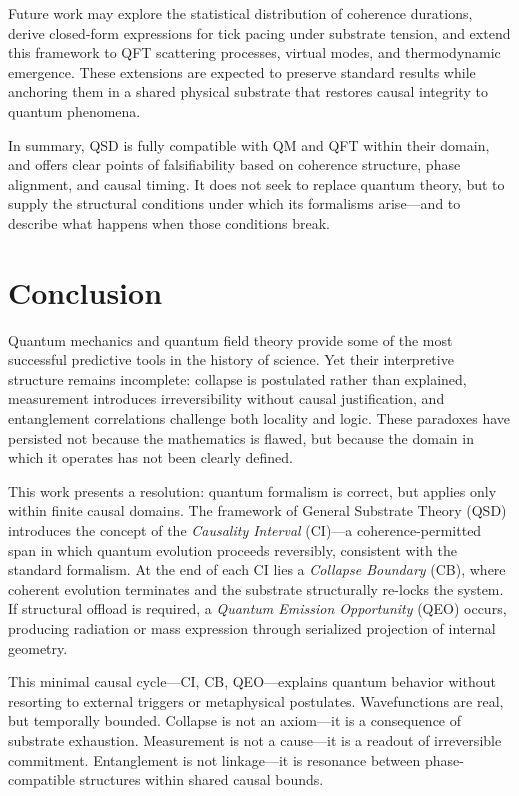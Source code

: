 \documentclass[preprints,article,submit,pdftex,moreauthors]{Definitions/mdpi}
\begin{document}
Future work may explore the statistical distribution of coherence durations, derive closed-form expressions for tick pacing under substrate tension, and extend this framework to QFT scattering processes, virtual modes, and thermodynamic emergence. These extensions are expected to preserve standard results while anchoring them in a shared physical substrate that restores causal integrity to quantum phenomena.

\smallskip

In summary, QSD is fully compatible with QM and QFT within their domain, and offers clear points of falsifiability based on coherence structure, phase alignment, and causal timing. It does not seek to replace quantum theory, but to supply the structural conditions under which its formalisms arise—and to describe what happens when those conditions break.



\section{Conclusion}

Quantum mechanics and quantum field theory provide some of the most successful predictive tools in the history of science. Yet their interpretive structure remains incomplete: collapse is postulated rather than explained, measurement introduces irreversibility without causal justification, and entanglement correlations challenge both locality and logic. These paradoxes have persisted not because the mathematics is flawed, but because the domain in which it operates has not been clearly defined.

This work presents a resolution: quantum formalism is correct, but applies only within finite causal domains. The framework of General Substrate Theory (QSD) introduces the concept of the \textit{Causality Interval} (CI)—a coherence-permitted span in which quantum evolution proceeds reversibly, consistent with the standard formalism. At the end of each CI lies a \textit{Collapse Boundary} (CB), where coherent evolution terminates and the substrate structurally re-locks the system. If structural offload is required, a \textit{Quantum Emission Opportunity} (QEO) occurs, producing radiation or mass expression through serialized projection of internal geometry.

This minimal causal cycle—CI, CB, QEO—explains quantum behavior without resorting to external triggers or metaphysical postulates. Wavefunctions are real, but temporally bounded. Collapse is not an axiom—it is a consequence of substrate exhaustion. Measurement is not a cause—it is a readout of irreversible commitment. Entanglement is not linkage—it is resonance between phase-compatible structures within shared causal bounds.
\end{document}

